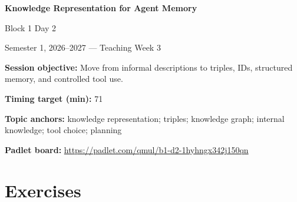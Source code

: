 \documentclass[11pt]{article}
\begin{document}
\begin{center}\LARGE\bfseries Knowledge Representation for Agent Memory\end{center}

\begin{center}\large Block 1 Day 2\end{center}

\begin{center}Semester 1, 2026--2027 --- Teaching Week 3\end{center}

\begin{tcolorbox}[colback=MidnightBlue!4,colframe=MidnightBlue,title={Session Overview},fonttitle=\bfseries,breakable]
\textbf{Session objective:} Move from informal descriptions to triples, IDs, structured memory, and controlled tool use.

\textbf{Timing target (min):} 71

\textbf{Topic anchors:} knowledge representation; triples; knowledge graph; internal knowledge; tool choice; planning

\textbf{Padlet board:} \url{https://padlet.com/qmul/b1-d2-1hyhngx342j150qn}
\end{tcolorbox}

\section*{Exercises}
\end{document}

